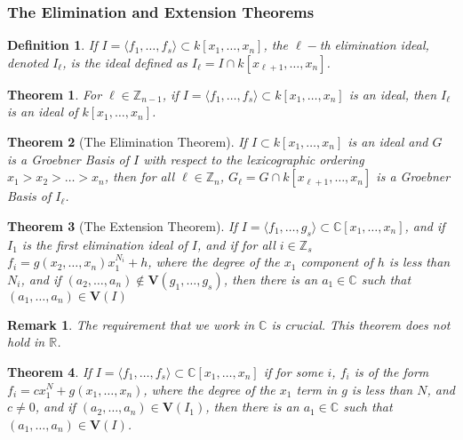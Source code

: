 \documentclass{article}
\theoremstyle{mystyle}
\newtheorem{theorem}{Theorem}[section]
\newtheorem{definition}{Definition}[section]
\newtheorem{remark}{Remark}[section]
\begin{document}
\subsubsection{The Elimination and Extension Theorems}
\begin{definition}
If $I = \langle f_1,\hdots, f_s\rangle \subset k[x_1,\hdots ,x_n]$, the $\ell-$th elimination ideal, denoted $I_{\ell}$, is the ideal defined as $I_{\ell} = I \cap k[x_{\ell+1},\hdots, x_n]$.
\end{definition}
\begin{theorem}
For $\ell \in \mathbb{Z}_{n-1}$, if $I = \langle f_1,\hdots, f_s\rangle\subset k[x_1,\hdots ,x_n]$ is an ideal, then $I_{\ell}$ is an ideal of $k[x_1,\hdots ,x_n]$.
\end{theorem}
\begin{theorem}[The Elimination Theorem]
If $I\subset k[x_1,\hdots ,x_n]$ is an ideal and $G$ is a Groebner Basis of $I$ with respect to the lexicographic ordering $x_1>x_2>\hdots > x_n$, then for all $\ell \in \mathbb{Z}_{n}$, $G_{\ell} = G\cap k[x_{\ell+1},\hdots, x_n]$ is a Groebner Basis of $I_{\ell}$.
\end{theorem}
\begin{theorem}[The Extension Theorem]
If $I = \langle f_1,\hdots, g_s\rangle \subset \mathbb{C}[x_1,\hdots ,x_n]$, and if $I_1$ is the first elimination ideal of $I$, and if for all $i\in \mathbb{Z}_s$ $f_i = g(x_2,\hdots, x_n)x_1^{N_i}+h$, where the degree of the $x_1$ component of $h$ is less than $N_i$, and if $(a_2,\hdots, a_n)\notin \textbf{V}(g_1,\hdots, g_s)$, then there is an $a_1 \in \mathbb{C}$ such that $(a_1,\hdots, a_n)\in \textbf{V}(I)$
\end{theorem}
\begin{remark}
The requirement that we work in $\mathbb{C}$ is crucial. This theorem does not hold in $\mathbb{R}$. 
\end{remark}
\begin{theorem}
If $I = \langle f_1,\hdots, f_s\rangle \subset \mathbb{C}[x_1,\hdots, x_n]$ if for some $i$, $f_i$ is of the form $f_i = cx_1^N + g(x_1,\hdots, x_n)$, where the degree of the $x_1$ term in $g$ is less than $N$, and $c \ne 0$, and if $(a_2,\hdots, a_n) \in \textbf{V}(I_{1})$, then there is an $a_1 \in \mathbb{C}$ such that $(a_1,\hdots, a_n) \in \textbf{V}(I)$.
\end{theorem}
\end{document}
